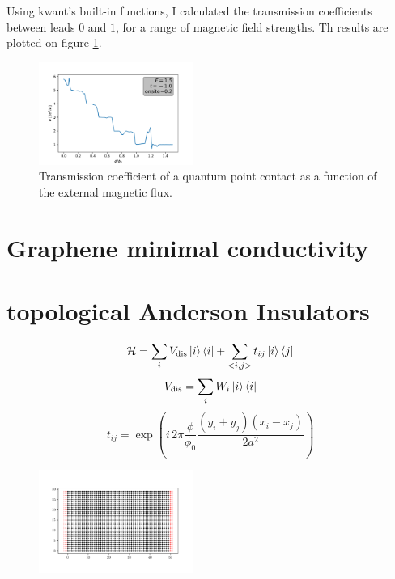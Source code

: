 \documentclass[11pt, a4paper, twocolumn]{article}
\begin{document}
Using kwant's built-in functions, I calculated the transmission coefficients between leads $0$
and $1$, for a range of magnetic field strengths. Th results are plotted on figure \ref{fig:qpc_L15_W5_VS0_2_cond_phi_e1_5}.

\begin{figure}[H]
  \begin{center}
  \includegraphics[width=0.45\textwidth]{./media/qpc_L15_W5_VS0_2_cond_phi_e1_5.png}
  \caption{Transmission coefficient of a quantum point contact as a function of the external magnetic flux.}
  \label{fig:qpc_L15_W5_VS0_2_cond_phi_e1_5}
  \end{center}
\end{figure}

\section*{Graphene minimal conductivity}


\section*{topological Anderson Insulators}
\begin{equation*}
  \mathcal H = \sum\limits_i V_{\textrm{dis}}\ket i \bra i + \sum\limits_{<i,j>} t_{ij} \ket i \bra j
\end{equation*}
\begin{equation*}
  V_\text{dis} = \sum_i W_i \ket i \bra i
\end{equation*}
\begin{equation*}
  t_{ij} = \exp\left(i\, 2 \pi \frac{\phi}{\phi_0} \frac{(y_i + y_j)(x_i-x_j)}{2a^2} \right)
\end{equation*}

\begin{figure}[H]
  \begin{center}
  \includegraphics[width=0.45\textwidth]{./media/square_lattice_W=30_L=50.png}
  \caption{}
  \label{fig:square_lattice_W_30_L_50}
  \end{center}
\end{figure}
\end{document}
